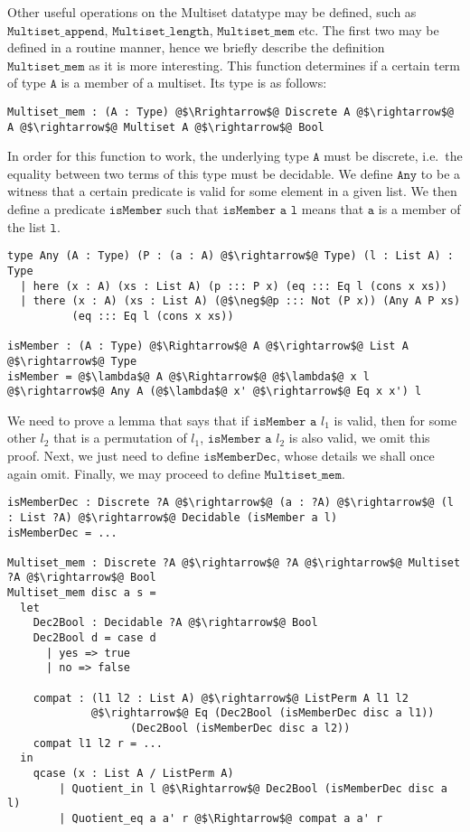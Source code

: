 \documentclass[12pt,twoside,maitrise]{dms}
\theoremstyle{definition}
\numberwithin{equation}{section}
\numberwithin{table}{chapter}
\numberwithin{figure}{chapter}
\newcommand\fn[1] {\texttt{#1}}
\begin{document}
Other useful operations on the Multiset datatype may be defined, such as
$\fn{Multiset\_append}$, $\fn{Multiset\_length}$, $\fn{Multiset\_mem}$ etc. The
first two may be defined in a routine manner, hence we briefly describe the
definition $\fn{Multiset\_mem}$ as it is more interesting. This function
determines if a certain term of type $\fn{A}$ is a member of a multiset. Its
type is as follows:

\begin{verbatim}
Multiset_mem : (A : Type) @$\Rrightarrow$@ Discrete A @$\rightarrow$@ A @$\rightarrow$@ Multiset A @$\rightarrow$@ Bool
\end{verbatim}

In order for this function to work, the underlying type $\fn{A}$ must be
discrete, i.e.\ the equality between two terms of this type must be decidable.
We define $\fn{Any}$ to be a witness that a certain predicate is valid for some
element in a given list. We then define a predicate $\fn{isMember}$ such that
$\fn{isMember a l}$ means that $\fn{a}$ is a member of the list $\fn{l}$.

\begin{verbatim}
type Any (A : Type) (P : (a : A) @$\rightarrow$@ Type) (l : List A) : Type
  | here (x : A) (xs : List A) (p ::: P x) (eq ::: Eq l (cons x xs))
  | there (x : A) (xs : List A) (@$\neg$@p ::: Not (P x)) (Any A P xs)
          (eq ::: Eq l (cons x xs))

isMember : (A : Type) @$\Rightarrow$@ A @$\rightarrow$@ List A @$\rightarrow$@ Type
isMember = @$\lambda$@ A @$\Rightarrow$@ @$\lambda$@ x l @$\rightarrow$@ Any A (@$\lambda$@ x' @$\rightarrow$@ Eq x x') l
\end{verbatim}

We need to prove a lemma that says that if $\fn{isMember a $l_1$}$ is valid,
then for some other $\fn{$l_2$}$ that is a permutation of $\fn{$l_1$}$,
$\fn{isMember a $l_2$}$ is also valid, we omit this proof. Next, we just need to
define $\fn{isMemberDec}$, whose details we shall once again omit. Finally, we
may proceed to define $\fn{Multiset\_mem}$.

\begin{verbatim}
isMemberDec : Discrete ?A @$\rightarrow$@ (a : ?A) @$\rightarrow$@ (l : List ?A) @$\rightarrow$@ Decidable (isMember a l)
isMemberDec = ...

Multiset_mem : Discrete ?A @$\rightarrow$@ ?A @$\rightarrow$@ Multiset ?A @$\rightarrow$@ Bool
Multiset_mem disc a s =
  let
    Dec2Bool : Decidable ?A @$\rightarrow$@ Bool
    Dec2Bool d = case d
      | yes => true
      | no => false

    compat : (l1 l2 : List A) @$\rightarrow$@ ListPerm A l1 l2
             @$\rightarrow$@ Eq (Dec2Bool (isMemberDec disc a l1))
                   (Dec2Bool (isMemberDec disc a l2))
    compat l1 l2 r = ...
  in
    qcase (x : List A / ListPerm A)
        | Quotient_in l @$\Rightarrow$@ Dec2Bool (isMemberDec disc a l)
        | Quotient_eq a a' r @$\Rightarrow$@ compat a a' r
\end{verbatim}
\end{document}
